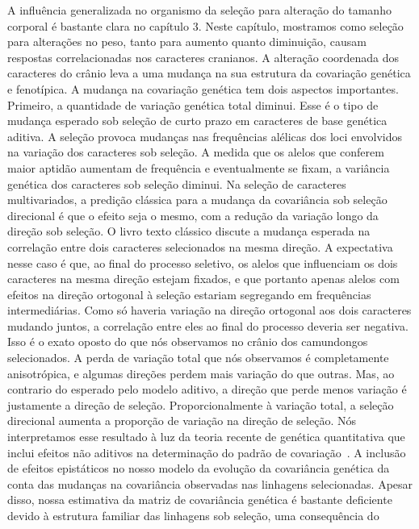 \begin{refsection}
A influência generalizada no organismo da seleção para alteração do tamanho
corporal é bastante clara no capítulo 3. Neste capítulo, mostramos como
seleção para alterações no peso, tanto para aumento quanto diminuição, causam
respostas correlacionadas nos caracteres cranianos. A alteração coordenada dos
caracteres do crânio leva a uma mudança na sua estrutura da covariação
genética e fenotípica. A mudança na covariação genética tem dois aspectos
importantes. Primeiro, a quantidade de variação genética total diminui. Esse é
o tipo de mudança esperado sob seleção de curto prazo em caracteres de base
genética aditiva. A seleção provoca mudanças nas frequências alélicas dos loci
envolvidos na variação dos caracteres sob seleção. A medida que os alelos que
conferem maior aptidão aumentam de frequência e eventualmente se fixam, a
variância genética dos caracteres sob seleção diminui. Na seleção de
caracteres multivariados, a predição clássica para a mudança da covariância
sob seleção direcional é que o efeito seja o mesmo, com a redução da variação
longo da direção sob seleção. O livro texto clássico
\textcite{Falconer1996-ot} discute a mudança esperada na correlação entre dois
caracteres selecionados na mesma direção. A expectativa nesse caso é que, ao
final do processo seletivo, os alelos que influenciam os dois caracteres na
mesma direção estejam fixados, e que portanto apenas alelos com efeitos na
direção ortogonal à seleção estariam segregando em frequências intermediárias.
Como só haveria variação na direção ortogonal aos dois caracteres mudando
juntos, a correlação entre eles ao final do processo deveria ser negativa.
Isso é o exato oposto do que nós observamos no crânio dos camundongos
selecionados. A perda de variação total que nós observamos é completamente
anisotrópica, e algumas direções perdem mais variação do que outras. Mas, ao
contrario do esperado pelo modelo aditivo, a direção que perde menos variação
é justamente a direção de seleção. Proporcionalmente à variação total, a
seleção direcional aumenta a proporção de variação na direção de seleção. Nós
interpretamos esse resultado à luz da teoria recente de genética quantitativa
que inclui efeitos não aditivos na determinação do padrão de
covariação~\parencite{Pavlicev2011-wz, Cheverud2001-ho}. A inclusão de efeitos
epistáticos no nosso modelo da evolução da covariância genética da conta das
mudanças na covariância observadas nas linhagens selecionadas. Apesar disso,
nossa estimativa da matriz de covariância genética é bastante deficiente
devido à estrutura familiar das linhagens sob seleção, uma consequência do

\end{refsection}
